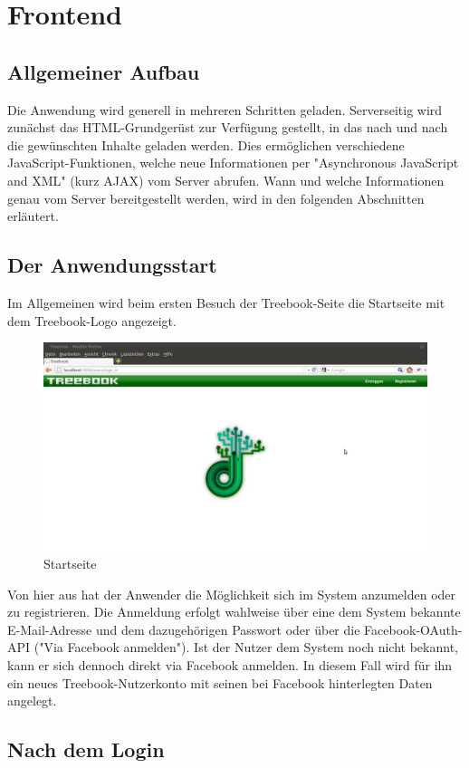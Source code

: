 \documentclass[10pt,a4paper]{book}
\makeatletter
\def\ScaleIfNeeded{%
\ifdim\Gin@nat@width>\linewidth
\linewidth
\else
\Gin@nat@width
\fi
}
\makeatother
\begin{document}
\chapter{Frontend}
\section{Allgemeiner Aufbau}
Die Anwendung wird generell in mehreren Schritten geladen. Serverseitig wird zunächst das HTML-Grundgerüst zur Verfügung gestellt, in das nach und nach die gewünschten Inhalte geladen werden.
Dies ermöglichen verschiedene JavaScript-Funktionen, welche neue Informationen per "Asynchronous JavaScript and XML" (kurz AJAX) vom Server abrufen.
Wann und welche Informationen genau vom Server bereitgestellt werden, wird in den folgenden Abschnitten erläutert.

\section{Der Anwendungsstart}
Im Allgemeinen wird beim ersten Besuch der Treebook-Seite die Startseite mit dem Treebook-Logo angezeigt.
\begin{figure}[htbp]
\centering
\includegraphics[width=\ScaleIfNeeded]{Pictures/screen_startup.png}%
\caption{Startseite}%
\end{figure}
Von hier aus hat der Anwender die Möglichkeit sich im System anzumelden oder zu registrieren.
Die Anmeldung erfolgt wahlweise über eine dem System bekannte E-Mail-Adresse und dem dazugehörigen Passwort oder über die Facebook-OAuth-API ("Via Facebook anmelden").
Ist der Nutzer dem System noch nicht bekannt, kann er sich dennoch direkt via Facebook anmelden. In diesem Fall wird für ihn ein neues Treebook-Nutzerkonto mit seinen bei Facebook hinterlegten Daten angelegt.

\section{Nach dem Login}
\end{document}
